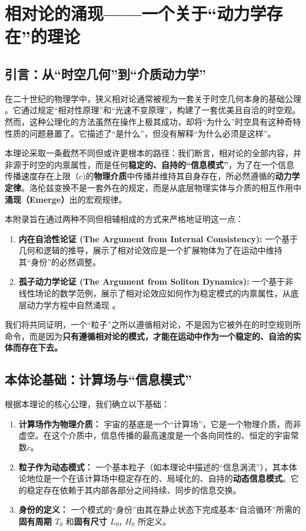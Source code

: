 \documentclass[11pt, a4paper]{article}
\begin{document}
\appendix
\section{相对论的涌现——一个关于“动力学存在”的理论}

\subsection{引言：从“时空几何”到“介质动力学”}

在二十世纪的物理学中，狭义相对论通常被视为一套关于时空几何本身的基础公理 \cite{Einstein1905}。它通过规定“相对性原理”和“光速不变原理”，构建了一套优美且自洽的时空观。然而，这种公理化的方法虽然在操作上极其成功，却将“为什么”时空具有这种奇特性质的问题悬置了。它描述了“是什么”，但没有解释“为什么必须是这样”。

本理论采取一条截然不同但或许更根本的路径：我们断言，相对论的全部内容，并非源于时空的内禀属性，而是任何\textbf{稳定的、自持的“信息模式”}，为了在一个信息传播速度存在上限（$c$)的\textbf{物理介质}中传播并维持其自身存在，所必然遵循的\textbf{动力学定律}。洛伦兹变换不是一套外在的规定，而是从底层物理实体与介质的相互作用中\textbf{涌现（Emerge）}出的宏观规律。

本附录旨在通过两种不同但相辅相成的方式来严格地证明这一点：

\begin{enumerate}
    \item \textbf{内在自洽性论证 (The Argument from Internal Consistency):} 一个基于几何和逻辑的推导，展示了相对论效应是一个扩展物体为了在运动中维持其“身份”的必然调整。
    \item \textbf{孤子动力学论证 (The Argument from Soliton Dynamics):} 一个基于非线性场论的数学范例，展示了相对论效应如何作为稳定模式的内禀属性，从底层动力学方程中自然涌现 \cite{DrazinJohnson1989}。
\end{enumerate}

我们将共同证明，一个“粒子”之所以遵循相对论，不是因为它被外在的时空规则所命令，而是因为\textbf{只有遵循相对论的模式，才能在运动中作为一个稳定的、自洽的实体而存在下去。}

\subsection{本体论基础：计算场与“信息模式”}

根据本理论的核心公理，我们确立以下基础：

\begin{enumerate}
    \item \textbf{计算场作为物理介质：} 宇宙的基底是一个“计算场”，它是一个物理介质，而非虚空。在这个介质中，信息传播的最高速度是一个各向同性的、恒定的宇宙常数$c$。
    \item \textbf{粒子作为动态模式：} 一个基本粒子（如本理论中描述的“信息涡流”），其本体论地位是一个在该计算场中稳定存在的、局域化的、自持的\textbf{动态信息模式}。它的稳定存在依赖于其内部各部分之间持续、同步的信息交换。
    \item \textbf{身份的定义：} 一个模式的“身份”由其在静止状态下完成基本“自洽循环”所需的\textbf{固有周期 $T_0$} 和\textbf{固有尺寸 $L_0$, $H_0$} 所定义。
\end{enumerate}
\end{document}
